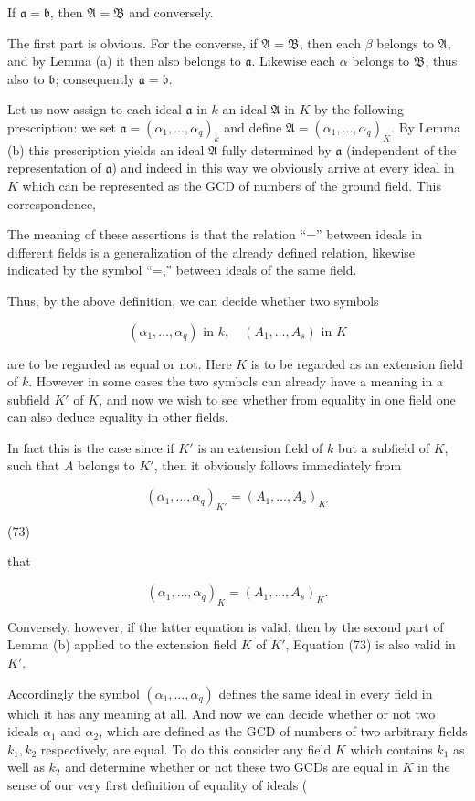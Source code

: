 If $\mathfrak{a} = \mathfrak{b}$, then $\mathfrak{A} = \mathfrak{B}$ and conversely.

The first part is obvious. For the converse, if $\mathfrak{A} = \mathfrak{B}$, then each $\beta$ belongs to $\mathfrak{A}$, and by Lemma (a) it then also belongs to $\mathfrak{a}$. Likewise each $\alpha$ belongs to $\mathfrak{B}$, thus also to $\mathfrak{b}$; consequently $\mathfrak{a} = \mathfrak{b}$.

Let us now assign to each ideal $\mathfrak{a}$ in $k$ an ideal $\mathfrak{A}$ in $K$ by the following prescription: we set $\mathfrak{a} = (\alpha_1, \ldots, \alpha_q)_k$ and define $\mathfrak{A} = (\alpha_1, \ldots, \alpha_q)_K$. By Lemma (b) this prescription yields an ideal $\mathfrak{A}$ fully determined by $\mathfrak{a}$ (independent of the representation of $\mathfrak{a}$) and indeed in this way we obviously arrive at every ideal in $K$ which can be represented as the GCD of numbers of the ground field. This correspondence,

The meaning of these assertions is that the relation “=” between ideals in different fields is a generalization of the already defined relation, likewise indicated by the symbol “=,” between ideals of the same field.

Thus, by the above definition, we can decide whether two symbols

$$\left( \alpha_1, \ldots, \alpha_q \right) \text{ in } k, \quad \left( A_1, \ldots, A_s \right) \text{ in } K$$

are to be regarded as equal or not. Here $K$ is to be regarded as an extension field of $k$. However in some cases the two symbols can already have a meaning in a subfield $K'$ of $K$, and now we wish to see whether from equality in one field one can also deduce equality in other fields.

In fact this is the case since if $K'$ is an extension field of $k$ but a subfield of $K$, such that $A$ belongs to $K'$, then it obviously follows immediately from

$$\left( \alpha_1, \ldots, \alpha_q \right)_{K'} = \left( A_1, \ldots, A_s \right)_{K'}$$

(73)

that

$$\left( \alpha_1, \ldots, \alpha_q \right)_K = \left( A_1, \ldots, A_s \right)_K.$$

Conversely, however, if the latter equation is valid, then by the second part of Lemma (b) applied to the extension field $K$ of $K'$, Equation (73) is also valid in $K'$.

Accordingly the symbol $\left( \alpha_1, \ldots, \alpha_q \right)$ defines the same ideal in every field in which it has any meaning at all. And now we can decide whether or not two ideals $\alpha_1$ and $\alpha_2$, which are defined as the GCD of numbers of two arbitrary fields $k_1, k_2$ respectively, are equal. To do this consider any field $K$ which contains $k_1$ as well as $k_2$ and determine whether or not these two GCDs are equal in $K$ in the sense of our very first definition of equality of ideals (
